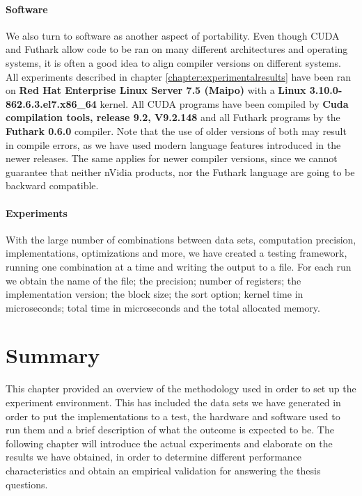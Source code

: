 \paragraph{Software}
We also turn to software as another aspect of portability. Even though CUDA and Futhark allow code to be ran on many different architectures and operating systems, it is often a good idea to align compiler versions on different systems. All experiments described in chapter \ref{chapter:experimentalresults} have been ran on \textbf{Red Hat Enterprise Linux Server 7.5 (Maipo)} with a \textbf{Linux 3.10.0-862.6.3.el7.x86\_64} kernel. All CUDA programs have been compiled by \textbf{Cuda compilation tools, release 9.2, V9.2.148} and all Futhark programs by the \textbf{Futhark 0.6.0} compiler. Note that the use of older versions of both may result in compile errors, as we have used modern language features introduced in the newer releases. The same applies for newer compiler versions, since we cannot guarantee that neither nVidia products, nor the Futhark language are going to be backward compatible.

\paragraph{Experiments}
With the large number of combinations between data sets, computation precision, implementations, optimizations and more, we have created a testing framework, running one combination at a time and writing the output to a file. For each run we obtain the name of the file; the precision; number of registers; the implementation version; the block size; the sort option; kernel time in microseconds; total time in microseconds and the total allocated memory.

\section*{Summary}
This chapter provided an overview of the methodology used in order to set up the experiment environment. This has included the data sets we have generated in order to put the implementations to a test, the hardware and software used to run them and a brief description of what the outcome is expected to be. The following chapter will introduce the actual experiments and elaborate on the results we have obtained, in order to determine different performance characteristics and obtain an empirical validation for answering the thesis questions.